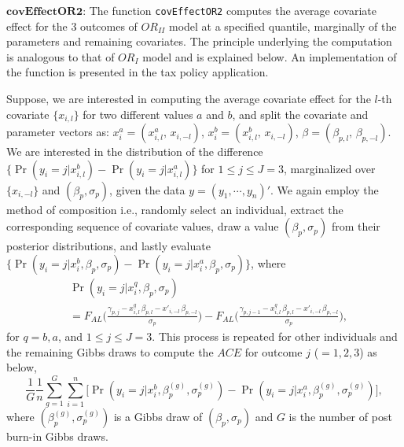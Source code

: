 \(\textbf{covEffectOR2}\): The function \texttt{covEffectOR2} computes the average covariate effect for the 3 outcomes of \(OR_{II}\) model at a specified quantile, marginally of the parameters and remaining covariates. The principle underlying the computation is analogous to that of \(OR_{I}\) model and is explained below. An implementation of the function is presented in the tax policy application.

Suppose, we are interested in computing the average covariate effect for the \(l\)-th covariate \(\{x_{i,l}\}\) for two different values \(a\) and \(b\), and split the covariate and parameter vectors as: \(x_{i}^{a} = ( x_{i,l}^{a}, \,x_{i,-l})\), \(x_{i}^{b} = (x_{i,l}^{b}, \, x_{i,-l})\), \(\beta = (\beta_{p,l}, \, \beta_{p,-l})\). We are interested in the distribution of the difference \(\{\Pr(y_{i}=j|x_{i,l}^{b}) - \Pr(y_{i}=j|x_{i,l}^{a} ) \}\) for \(1 \le j \le J=3\), marginalized over \(\{x_{i,-l}\}\) and \((\beta_{p},\sigma_{p})\), given the data \(y=(y_{1}, \cdots, y_{n})'\). We again employ the method of composition i.e., randomly select an individual, extract the corresponding sequence of covariate values, draw a value \((\beta_{p}, \sigma_{p})\) from their posterior distributions, and lastly evaluate \(\{\Pr(y_{i}=j|x_{i}^{b},\beta_{p},\sigma_{p}) - \Pr(y_{i}=j|x_{i}^{a},\beta_{p},\sigma_{p} )\}\), where
\begin{equation*}
\begin{split}
& \Pr(y_{i}=j|x_{i}^{q},\beta_{p},\sigma_{p}) \\
& = F_{AL}\bigg( \frac{\gamma_{p,j} - x_{i,l}^{q} \, \beta_{p,l} - x'_{i,-l} \,          \beta_{p,-l}}{\sigma_{p}} \bigg) - F_{AL}\bigg( \frac{\gamma_{p,j-1} - x_{i,l}^{q} \, \beta_{p,l} - x'_{i,-l} \, \beta_{p,-l}}{\sigma_{p}} \bigg),
\end{split}
\end{equation*}
for \(q=b, a\), and \(1 \le j \le J=3\). This process is repeated for other individuals and the remaining Gibbs draws to compute the \(ACE\) for outcome \(j\) (\(=1,2,3\)) as below,
\begin{equation}
  \frac{1}{G} \frac{1}{n} \sum_{g=1}^{G}
    \sum_{i=1}^{n} \Big[ \Pr(y_{i}=j|x_{i}^{b},\beta_{p}^{(g)},\sigma_{p}^{(g)}) - \Pr(y_{i}=j|x_{i}^{a},\beta_{p}^{(g)},\sigma_{p}^{(g)} ) \Big],
    \label{eq:ACEOR2}
\end{equation}
where \((\beta_{p}^{(g)},\sigma_{p}^{(g)})\) is a Gibbs draw of \((\beta_{p}, \sigma_{p})\) and \(G\) is the number of post burn-in Gibbs draws.

